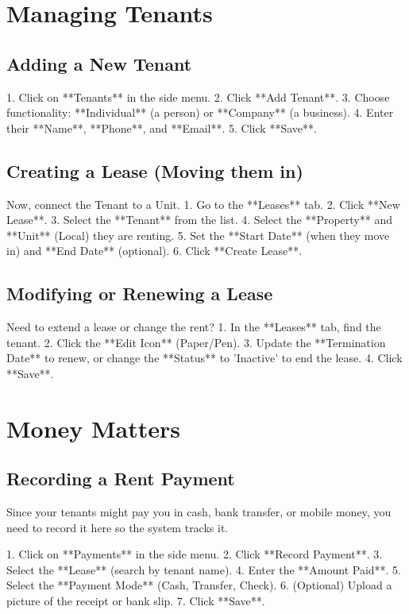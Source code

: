 \documentclass[12pt,a4paper]{article}
\begin{document}
\section{Managing Tenants}

\subsection{Adding a New Tenant}
1. Click on **Tenants** in the side menu.
2. Click **Add Tenant**.
3. Choose functionality: **Individual** (a person) or **Company** (a business).
4. Enter their **Name**, **Phone**, and **Email**.
5. Click **Save**.

\subsection{Creating a Lease (Moving them in)}
Now, connect the Tenant to a Unit.
1. Go to the **Leases** tab.
2. Click **New Lease**.
3. Select the **Tenant** from the list.
4. Select the **Property** and **Unit** (Local) they are renting.
5. Set the **Start Date** (when they move in) and **End Date** (optional).
6. Click **Create Lease**.

\subsection{Modifying or Renewing a Lease}
Need to extend a lease or change the rent?
1. In the **Leases** tab, find the tenant.
2. Click the **Edit Icon** (Paper/Pen).
3. Update the **Termination Date** to renew, or change the **Status** to 'Inactive' to end the lease.
4. Click **Save**.

\section{Money Matters}

\subsection{Recording a Rent Payment}
Since your tenants might pay you in cash, bank transfer, or mobile money, you need to record it here so the system tracks it.

1. Click on **Payments** in the side menu.
2. Click **Record Payment**.
3. Select the **Lease** (search by tenant name).
4. Enter the **Amount Paid**.
5. Select the **Payment  Mode** (Cash, Transfer, Check).
6. (Optional) Upload a picture of the receipt or bank slip.
7. Click **Save**.
\end{document}
